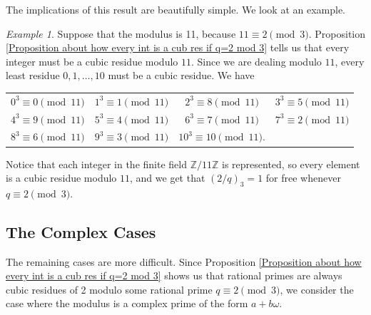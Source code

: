 \documentclass[10pt]{amsart}
\newcommand{\ZZ}{\mathbb{Z}}
\theoremstyle{plain}
\theoremstyle{definition}
\theoremstyle{remark}
\newtheorem{ex}{Example}
\numberwithin{equation}{section}
\begin{document}
The implications of this result are beautifully simple. We look at an example. 
\begin{ex}
    Suppose that the modulus is 11, because $11\equiv 2\pmod{3}$. Proposition \ref{Proposition about how every int is a cub res if q=2 mod 3} tells us that every integer must be a cubic residue modulo $11$. Since we are dealing modulo $11$, every least residue $0,1,\ldots,10$ must be a cubic residue. We have

\begin{center}
\begin{tabular}{c c c c}
 $ 0^3 \equiv 0 \pmod{11}$ &
$1^3 \equiv 1 \pmod{11}$ &
$2^3 \equiv 8 \pmod{11}$ &
$3^3 \equiv 5 \pmod{11}$ 
\\
$4^3 \equiv 9 \pmod{11}$ &
$5^3 \equiv 4 \pmod{11}$ &
$6^3 \equiv 7 \pmod{11}$ &
$7^3 \equiv 2 \pmod{11}$ 
\\
$8^3 \equiv 6 \pmod{11}$ &
$9^3 \equiv 3 \pmod{11}$ &
$10^3 \equiv 10 \pmod{11}$. 
\end{tabular}
\end{center}

\noindent Notice that each integer in the finite field $\ZZ/11\ZZ$ is represented, so every element is a cubic residue modulo $11$, and we get that $(2/q)_{3}=1$ for free whenever $q\equiv 2\pmod{3}$. 
\end{ex}

\subsection*{The Complex Cases} 
The remaining cases are more difficult. Since Proposition \ref{Proposition about how every int is a cub res if q=2 mod 3} shows us that rational primes are always cubic residues of 2 modulo some rational prime $q\equiv 2\pmod{3}$, we consider the case where the modulus is a complex prime of the form $a+b\omega$. 
\end{document}
